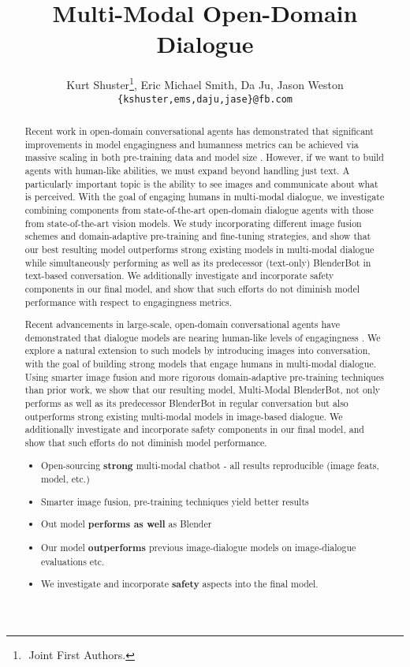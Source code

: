 \documentclass[11pt,a4paper]{article}
\title{
Multi-Modal Open-Domain Dialogue
}
\author{Kurt Shuster\thanks{\,\,Joint First Authors.}, Eric Michael Smith, Da Ju, Jason Weston \\
\texttt{\{kshuster,ems,daju,jase\}@fb.com}
 }
\date{}
\begin{document}
\maketitle
\begin{abstract}
Recent work in open-domain conversational agents has demonstrated that significant improvements in model engagingness and humanness metrics can be achieved via massive scaling in both pre-training data and model size \cite{adiwardana2020meena,roller2020recipes}. However, if we want to build agents with human-like abilities, we must expand beyond handling just text. A particularly important topic is the ability to see images and  communicate about what is perceived. With the goal of engaging humans in multi-modal dialogue, we investigate combining components from state-of-the-art open-domain dialogue agents with those from state-of-the-art vision models. We study incorporating different image fusion schemes and domain-adaptive pre-training and fine-tuning strategies, and show that our best resulting model outperforms strong existing models in multi-modal dialogue while simultaneously performing as well as its predecessor (text-only) BlenderBot \cite{roller2020recipes} in text-based conversation.
We additionally investigate and incorporate safety components in our final model, and show that such efforts do not diminish model performance with respect to engagingness metrics.

Recent advancements in large-scale, open-domain conversational agents have demonstrated that dialogue models are nearing human-like levels of engagingness \cite{adiwardana2020meena,roller2020recipes}. We explore a natural extension to such models by introducing images into conversation, with the goal of building strong models that engage humans in multi-modal dialogue. Using smarter image fusion and more rigorous domain-adaptive pre-training techniques than prior work, we show that our resulting model, Multi-Modal BlenderBot, not only performs as well as its predecessor BlenderBot \cite{roller2020recipes} in regular conversation but also outperforms strong existing multi-modal models in image-based dialogue. We additionally investigate and incorporate safety components in our final model, and show that such efforts do not diminish model performance.

\fi
{}
\begin{itemize}
    \item Open-sourcing \textbf{strong} multi-modal chatbot - all results reproducible (image feats, model, etc.) 
    \item Smarter image fusion, pre-training techniques yield better results 
    \item Out model \textbf{performs as well} as Blender \cite{roller2020recipes} 
    \item Our model \textbf{outperforms} previous image-dialogue models on image-dialogue evaluations \cite{shuster2020image} etc. 
    \item We investigate and incorporate \textbf{safety} aspects into the final model.
\end{itemize}
\fi

\end{abstract}
\end{document}
